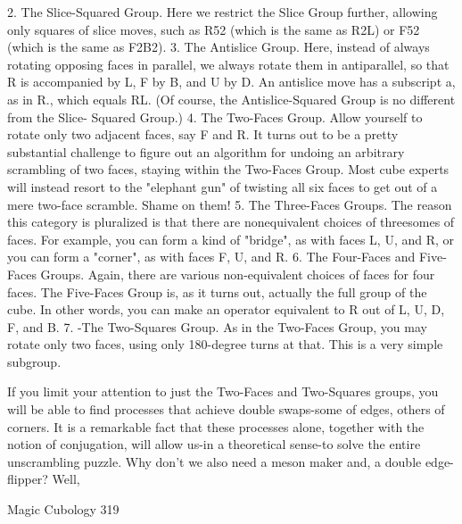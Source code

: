           2. The Slice-Squared Group. Here we restrict the Slice Group further,
   allowing only squares of slice moves, such as R52 (which is the same as R2L)
   or F52 (which is the same as F2B2).
           3. The Antislice Group. Here, instead of always rotating opposing faces
   in parallel, we always rotate them in antiparallel, so that R is accompanied by L,
   F by B, and U by D. An antislice move has a subscript a, as in R., which equals
   RL. (Of course, the Antislice-Squared Group is no different from the Slice-
   Squared Group.)
           4. The Two-Faces Group. Allow yourself to rotate only two adjacent
   faces, say F and R. It turns out to be a pretty substantial challenge to figure out
   an algorithm for undoing an arbitrary scrambling of two faces, staying within
   the Two-Faces Group. Most cube experts will instead resort to the "elephant
   gun" of twisting all six faces to get out of a mere two-face scramble. Shame on
   them!
           5. The Three-Faces Groups. The reason this category is pluralized is that
   there are nonequivalent choices of threesomes of faces. For example, you can
   form a kind of "bridge", as with faces L, U, and R, or you can form a "corner",
   as with faces F, U, and R.
           6. The Four-Faces and Five-Faces Groups. Again, there are various
   non-equivalent choices of faces for four faces. The Five-Faces Group is, as it
   turns out, actually the full group of the cube. In other words, you can make an
   operator equivalent to R out of L, U, D, F, and B.
           7. -The Two-Squares Group. As in the Two-Faces Group, you may
   rotate only two faces, using only 180-degree turns at that. This is a very simple
   subgroup.

        If you limit your attention to just the Two-Faces and Two-Squares groups, you
will be able to find processes that achieve double swaps-some of edges, others of
corners. It is a remarkable fact that these processes alone, together with the notion of
conjugation, will allow us-in a theoretical sense-to solve the entire unscrambling
puzzle.
        Why don't we also need a meson maker and, a double edge-flipper? Well,


Magic Cubology                                                                       319


